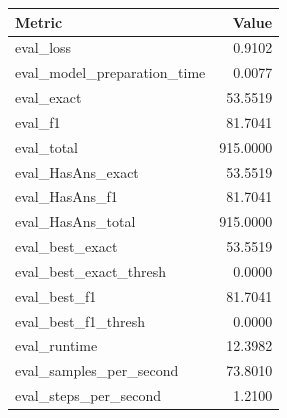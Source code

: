 \begin{tabular}{lr}
\toprule
Metric & Value \\
\midrule
eval_loss & 0.9102 \\
eval_model_preparation_time & 0.0077 \\
eval_exact & 53.5519 \\
eval_f1 & 81.7041 \\
eval_total & 915.0000 \\
eval_HasAns_exact & 53.5519 \\
eval_HasAns_f1 & 81.7041 \\
eval_HasAns_total & 915.0000 \\
eval_best_exact & 53.5519 \\
eval_best_exact_thresh & 0.0000 \\
eval_best_f1 & 81.7041 \\
eval_best_f1_thresh & 0.0000 \\
eval_runtime & 12.3982 \\
eval_samples_per_second & 73.8010 \\
eval_steps_per_second & 1.2100 \\
\bottomrule
\end{tabular}
